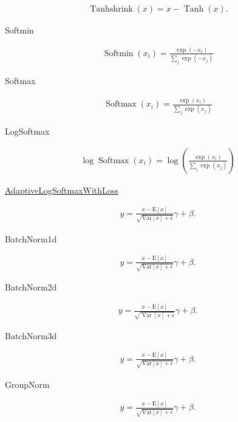 \begin{align}
    \operatorname{Tanhshrink} (x)=x- \operatorname{Tanh} (x).
\end{align}

Softmin

\begin{align}
    \operatorname{Softmin}\left(x_{i}\right)=\frac{\exp \left(-x_{i}\right)}{\sum_{j} \exp \left(-x_{j}\right)}
\end{align}

Softmax

\begin{align}
    \operatorname{Softmax}\left(x_{i}\right)=\frac{\exp \left(x_{i}\right)}{\sum_{j} \exp \left(x_{j}\right)}
\end{align}

LogSoftmax

\begin{align}
    \log \operatorname{Softmax}\left(x_{i}\right)=\log \left(\frac{\exp \left(x_{i}\right)}{\sum_{j} \exp \left(x_{j}\right)}\right)
\end{align}


\href{https://pytorch.org/docs/stable/nn.html#torch.nn.Softshrink}{AdaptiveLogSoftmaxWithLoss}

\begin{align}
    y=\frac{x-\mathrm{E}[x]}{\sqrt{\mathrm{Var}[x]+\epsilon}}  \gamma+\beta.
\end{align}

BatchNorm1d

\begin{align}
    y=\frac{x-\mathrm{E}[x]}{\sqrt{\mathrm{Var}[x]+\epsilon}}  \gamma+\beta.
\end{align}

BatchNorm2d

\begin{align}
    y=\frac{x-\mathrm{E}[x]}{\sqrt{\operatorname{Var}[x]+\epsilon}}  \gamma+\beta.
\end{align}

BatchNorm3d

\begin{align}
    y=\frac{x-\mathrm{E}[x]}{\sqrt{\mathrm{Var}[x]+\epsilon}}  \gamma+\beta.
\end{align}


GroupNorm

\begin{align}
    y=\frac{x-\mathrm{E}[x]}{\sqrt{\mathrm{Var}[x]+\epsilon}}  \gamma+\beta.
\end{align}

